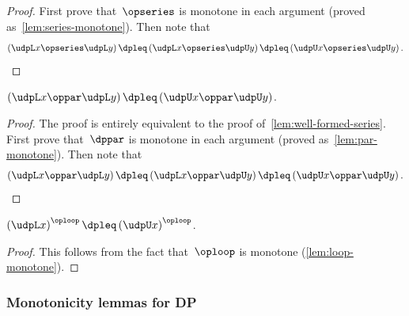 \begin{proof}
First prove that~$\opseries$ is monotone in each argument (proved
as~\cref{lem:series-monotone}). Then note that
\[
\left(\udpL x\opseries\udpL y\right)\dpleq\left(\udpL x\opseries\udpU y\right)\dpleq\left(\udpU x\opseries\udpU y\right).
\]
\end{proof}
\begin{lemma}
\label{lem:well-formed-par}$\left(\udpL x\oppar\udpL y\right)\dpleq\left(\udpU x\oppar\udpU y\right)$.
\end{lemma}
\begin{proof}
The proof is entirely equivalent to the proof of~\cref{lem:well-formed-series}.
First prove that~$\dppar$ is monotone in each argument (proved as~\cref{lem:par-monotone}).
Then note that~
\[
\left(\udpL x\oppar\udpL y\right)\dpleq\left(\udpL x\oppar\udpU y\right)\dpleq\left(\udpU x\oppar\udpU y\right).
\]
\end{proof}

\begin{lemma}
\label{lem:well-formed-loop}$\left(\udpL x\right)^{\oploop}\dpleq\left(\udpU x\right)^{\oploop}$.
\end{lemma}
\begin{proof}
This follows from the fact that~$\oploop$ is monotone (\cref{lem:loop-monotone}).
\end{proof}


\subsubsection{Monotonicity lemmas for DP}

